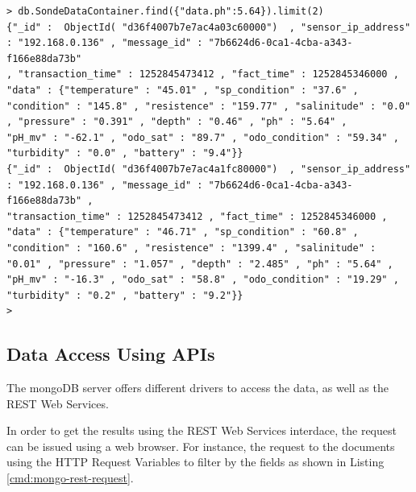 \lstset{label=cmd:mongo-find-limit,caption=Query Element with specific
projection limiting the result set size}
\begin{lstlisting}
> db.SondeDataContainer.find({"data.ph":5.64}).limit(2)
{"_id" :  ObjectId( "d36f4007b7e7ac4a03c60000")  , "sensor_ip_address" : "192.168.0.136" , "message_id" : "7b6624d6-0ca1-4cba-a343-f166e88da73b"
, "transaction_time" : 1252845473412 , "fact_time" : 1252845346000 , "data" : {"temperature" : "45.01" , "sp_condition" : "37.6" ,
"condition" : "145.8" , "resistence" : "159.77" , "salinitude" : "0.0" , "pressure" : "0.391" , "depth" : "0.46" , "ph" : "5.64" ,
"pH_mv" : "-62.1" , "odo_sat" : "89.7" , "odo_condition" : "59.34" , "turbidity" : "0.0" , "battery" : "9.4"}}
{"_id" :  ObjectId( "d36f4007b7e7ac4a1fc80000")  , "sensor_ip_address" : "192.168.0.136" , "message_id" : "7b6624d6-0ca1-4cba-a343-f166e88da73b" ,
"transaction_time" : 1252845473412 , "fact_time" : 1252845346000 , "data" : {"temperature" : "46.71" , "sp_condition" : "60.8" ,
"condition" : "160.6" , "resistence" : "1399.4" , "salinitude" : "0.01" , "pressure" : "1.057" , "depth" : "2.485" , "ph" : "5.64" ,
"pH_mv" : "-16.3" , "odo_sat" : "58.8" , "odo_condition" : "19.29" , "turbidity" : "0.2" , "battery" : "9.2"}}
>
\end{lstlisting}

\subsection{Data Access Using APIs}
\label{sec:dsp-mongodb-rest-ws}

The mongoDB server offers different drivers to access the data, as well as the
REST Web Services.

In order to get the results using the REST Web Services interdace, the request
can be issued using a web browser. For instance, the request to the documents
using the HTTP Request Variables to filter by the fields as shown in Listing 
\ref{cmd:mongo-rest-request}.

